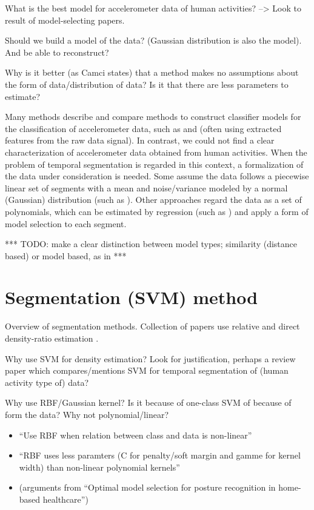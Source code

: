 What is the best model for accelerometer data of human activities? --> Look to result of model-selecting papers.

Should we build a model of the data? (Gaussian distribution is also the model). And be able to reconstruct?

Why is it better (as Camci states) that a method makes no assumptions about the form of data/distribution of data? Is it that there are less parameters to estimate?

Many methods describe and compare methods to construct classifier models for the classification of accelerometer data, such as \cite{kwapisz2011activity} and \cite{zhang2011optimal} (often using extracted features from the raw data signal).
In contrast, we could not find a clear characterization of accelerometer data obtained from human activities.
When the problem of temporal segmentation is regarded in this context, a formalization of the data under consideration is needed.
Some assume the data follows a piecewise linear set of segments with a mean and noise/variance modeled by a normal (Gaussian) distribution (such as \cite{camci2010change}).
Other approaches regard the data as a set of polynomials, which can be estimated by regression (such as \cite{chamroukhi2013joint}) and apply a form of model selection to each segment.

*** TODO: make a clear distinction between model types; similarity (distance based) or model based, as in \cite{yin2008sensor} ***

\section{Segmentation (SVM) method}
Overview of segmentation methods.
Collection of papers use relative and direct density-ratio estimation \cite{kawahara2009change, liu2013change}.

Why use SVM for density estimation? Look for justification, perhaps a review paper which compares/mentions SVM for temporal segmentation of (human activity type of) data?

Why use RBF/Gaussian kernel? Is it because of one-class SVM of because of form the data? Why not polynomial/linear?
\begin{itemize}
  \item ``Use RBF when relation between class and data is non-linear''
  \item ``RBF uses less paramters (C for penalty/soft margin and gamme for kernel width) than non-linear polynomial kernels''
  \item (arguments from \cite{zhang2011optimal} ``Optimal model selection for posture recognition in home-based healthcare'')
\end{itemize}




